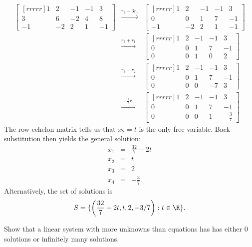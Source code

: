 \begin{solution}
\begin{eqnarray*}
\begin{bmatrix}[rrrrr]
1&2&-1&-1&3\\
3&6&-2&4&8\\
-1&-2&2&1&-1
\end{bmatrix}
&\xrightarrow[\hspace{35pt}]{r_2-3r_1}&
\begin{bmatrix}[rrrrr]
1&2&-1&-1&3\\
0&0&1&7&-1\\
-1&-2&2&1&-1
\end{bmatrix}\\
&\xrightarrow[\hspace{35pt}]{r_3+r_1 }&
\begin{bmatrix}[rrrrr]
1&2&-1&-1&3\\
0&0&1&7&-1\\
0&0&1&0&2
\end{bmatrix}
\\
&\xrightarrow[\hspace{35pt}]{r_3-r_2 }&
\begin{bmatrix}[rrrrr]
1&2&-1&-1&3\\
0&0&1&7&-1\\
0&0&0&-7&3
\end{bmatrix}
\\
&\xrightarrow[\hspace{35pt}]{-\frac{1}{7}r_3}&
\begin{bmatrix}[rrrrr]
\boxed{1}&2&-1&-1&3\\
0&0&\boxed{1}&7&-1\\
0&0&0&\boxed{1}&-\frac{3}{7}
\end{bmatrix}
\end{eqnarray*}
The row echelon matrix tells us that $x_2=t$ is the only free variable. Back substitution then yields the general solution:
\begin{eqnarray*}
x_1&=&\frac{32}{7}-2t\\
x_2&=&t\\
x_3&=&2\\
x_4&=&-\frac{3}{7}.
\end{eqnarray*}
Alternatively, the set of solutions is 
\[
S=\{\left(\frac{32}{7}-2t, t, 2, -3/7\right)\colon t\in\R\}.
\]
\end{solution}
\ii
\noindent
Show that a linear system with more unknowns than equations has has either 0 solutions or infinitely many solutions.
\\
